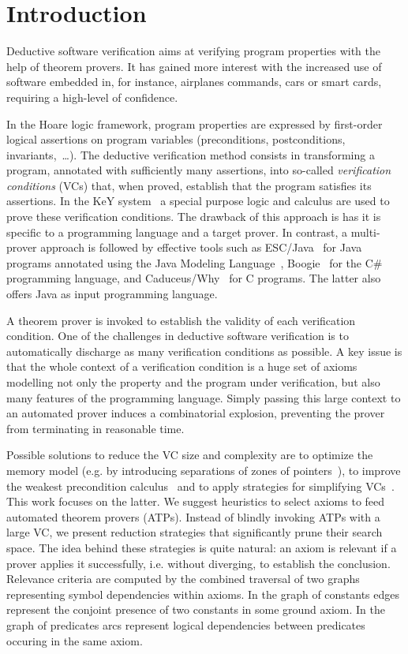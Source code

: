 \documentclass{acm_proc_article-sp}
\theoremstyle{nonumberplain}
\begin{document}
\section{Introduction}
Deductive software verification aims at verifying program properties
with the help of theorem provers. It has gained more interest with the
increased use of software embedded in, for instance, airplanes
commands, cars or smart cards, requiring a high-level of confidence.


In the Hoare logic framework, program properties are expressed by
first-order logical assertions on program variables (preconditions,
postconditions, invariants,~\ldots). The deductive verification method
consists in transforming a program, annotated with sufficiently many
assertions, into so-called \emph{verification conditions} (VCs) that,
when proved, establish that the program satisfies its assertions. In
the KeY system~\cite{KeYBook2007} a special purpose logic and calculus
are used to prove these verification conditions. The drawback of this
approach is has it is specific to a programming language and a target
prover. In contrast, a multi-prover approach is followed by effective
tools such as ESC/Java~\cite{escjava98} for Java programs annotated
using the Java Modeling Language~\cite{Burdy03b},
Boogie~\cite{BarnettLS04} for the C\# programming language, and
Caduceus/Why~\cite{filliatre07cav} for C programs. The latter also
offers Java as input programming language.



A theorem prover is invoked to establish the validity of each
verification condition. One of the challenges in deductive software
verification is to automatically discharge as many verification
conditions as possible. A key issue is that the whole context of a
verification condition is a huge set of axioms modelling not only the
property and the program under verification, but also many features of
the programming language. Simply passing this large context to an
automated prover induces a combinatorial explosion, preventing the
prover from terminating in reasonable time.


Possible solutions to reduce the VC size and complexity are to optimize
the memory model (e.g. by introducing separations of zones of
pointers~\cite{hubert07hav}), to improve the weakest precondition
calculus~\cite{Leino05} and to apply strategies for simplifying
VCs~\cite{Gri00,DenneyFS06,MP06}. This work focuses on the latter. We
suggest heuristics to select axioms to feed automated theorem provers
(ATPs). Instead of blindly invoking ATPs with a large VC, we present
reduction strategies that significantly prune their search space. The
idea behind these strategies is quite natural: an axiom is relevant if
a prover applies it successfully, i.e. without diverging, to establish
the conclusion. Relevance criteria are computed by the combined
traversal of two graphs representing symbol dependencies within axioms.
In the graph of constants edges represent the conjoint presence of two
constants in some ground axiom. In the graph of predicates arcs
represent logical dependencies between predicates occuring in the same
axiom.
\end{document}
